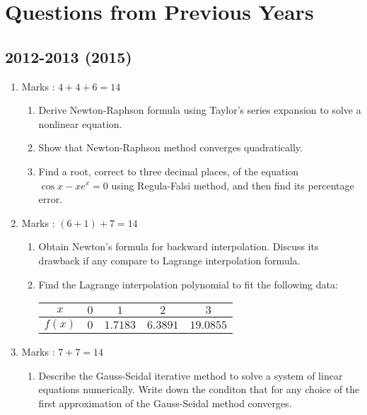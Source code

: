 \documentclass[12pt,class=book,crop=false]{standalone}
\begin{document}
\chapter*{Questions from Previous Years}
\section*{2012-2013 (2015)}
\begin{enumerate}
    \item Marks : $ 4+4+6=14 $
          \begin{enumerate}
              \item Derive Newton-Raphson formula using Taylor's series expansion to solve a nonlinear equation.
              \item Show that Newton-Raphson method converges quadratically.
              \item Find a root, correct to three decimal places, of the equation $ \cos x-xe^x=0 $ using Regula-Falsi method, and then find its percentage error.
          \end{enumerate}
    \item Marks : $ (6+1)+7=14 $
          \begin{enumerate}
              \item Obtain Newton's formula for backward interpolation. Discuss its drawback if any compare to Lagrange interpolation formula.
              \item Find the Lagrange interpolation polynomial to fit the following data:
                    \begin{table}[H]
                        \centering
                        \begin{tabular}{|c|c|c|c|c|}
                            \hline
                            $ x $    & $ 0 $ & $ 1 $      & $ 2 $      & $ 3 $       \\\hline
                            $ f(x) $ & $ 0 $ & $ 1.7183 $ & $ 6.3891 $ & $ 19.0855 $ \\\hline
                        \end{tabular}
                    \end{table}
          \end{enumerate}
    \item Marks : $ 7+7=14 $
          \begin{enumerate}
              \item Describe the Gauss-Seidal iterative method to solve a system of linear equations numerically. Write down the conditon that for any choice of the first approximation of the Gauss-Seidal method converges.

\end{enumerate}
\end{enumerate}
\end{document}
